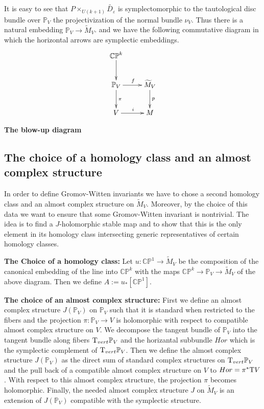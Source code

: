 \documentclass[a4paper,14pt]{article}
\newcommand{\B}[1]{\mathbb #1}
\newcommand{\eps}{{\varepsilon}}
\newcommand{\blowMV}{\widetilde {M}_V}
\newcommand{\cp}{{\B C\B P}}
\newcommand{\T }{\hbox {\text {T}}}
\newcommand{\BS}{{\bigskip}}
\newcommand{\NI}{{\noindent}}
\numberwithin{equation}{section}
\begin{document}
It is easy to see that
$P\times _{U(k+1)}\widetilde {D_{\eps }}$ is
symplectomorphic to the tautological disc bundle over
$\B P_V$  the
projectivization of the normal bundle $\nu _V$.
Thus there is a natural embedding $\B P_V\to \blowMV$.
and we have the following commutative diagram in which
the horizontal arrows are symplectic embeddings.
$$
\xymatrix{
\cp ^k \ar[d]        & \\
\B P_V \ar[d]^{\pi } \ar[r]^f & \blowMV \ar[d]^p \\
V                    \ar[r]^i & M
}\label{D:blow-up}
$$

\centerline{\bf The blow-up diagram}


\BS


\subsection{The choice of a homology class and an
almost complex structure}

\BS

In order to define Gromov-Witten invariants we have to
chose a second
homology class  and
an almost complex structure on $\blowMV$. Moreover,
by the choice of this data we want to ensure that
some Gromov-Witten invariant is nontrivial. The idea is
to find a $J$-holomorphic stable map and to show that
this is the only element in its homology class intersecting
generic representatives of certain homology
classes.


\NI
{\bf The Choice of a homology class:}
Let $u:\cp ^1 \to \blowMV$ be the composition of the
canonical embedding of the line into $\cp ^k$ with the
maps $\cp ^k\to \B P_V \to \blowMV$ of the above
diagram. Then  we define $A:=u_*[\cp ^1]$.

\NI
{\bf The choice of an almost complex structure:}
First we define an almost complex structure
$J(\B P_V)$ on $\B P_V$ such that it is standard when
restricted to the fibers and the projection
$\pi :\B P_V\to V$ is holomorphic with respect to
compatible almost complex structure on $V$.
We decompose the tangent bundle of $\B P_V$ into the tangent bundle
along fibers $\T _{vert}\B P_V$ and the horizantal subbundle $Hor$
which is the symplectic complement of $\T _{vert}\B P_V$.  Then we
define the
almost complex structure $J(\B P_V)$ as the direct sum of
standard complex structures on $\T _{vert}\B P_V$
and the pull back of a compatible almost
complex structure on $V$ to $Hor = \pi^* \T V$.
With respect to this almost complex
structure, the projection $\pi$ becomes holomorphic.
Finally, the needed almost complex structure $J$
on $\blowMV$ is an extension of $J(\B P_V)$ compatible
with the symplectic structure.
\end{document}
